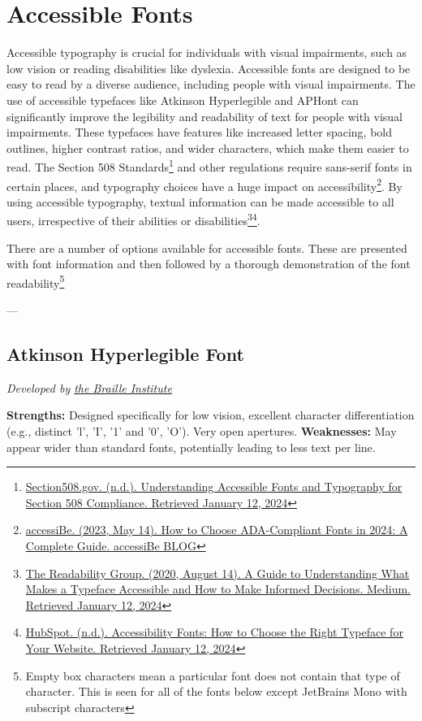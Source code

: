 \chapter{Accessible Fonts}\label{appx66}
\begin{raggedright}
Accessible typography is crucial for individuals with visual impairments, such as low vision or reading disabilities like dyslexia. Accessible fonts are designed to be easy to read by a diverse audience, including people with visual impairments. The use of accessible typefaces like Atkinson Hyperlegible and APHont can significantly improve the legibility and readability of text for people with visual impairments. These typefaces have features like increased letter spacing, bold outlines, higher contrast ratios, and wider characters, which make them easier to read. The Section 508 Standards\footnote{\raggedright \href{https://blog.hubspot.com/website/accessibility-fonts}{Section508.gov. (n.d.). Understanding Accessible Fonts and Typography for Section 508 Compliance. Retrieved January 12, 2024}} and other regulations require sans-serif fonts in certain places, and typography choices have a huge impact on accessibility\footnote{\raggedright \href{https://accessibe.com/blog/knowledgebase/ada-compliant-fonts}{accessiBe. (2023, May 14). How to Choose ADA-Compliant Fonts in 2024: A Complete Guide. accessiBe BLOG}}. By using accessible typography, textual information can be made accessible to all users, irrespective of their abilities or disabilities\footnote{\raggedright \href{https://medium.com/the-readability-group/a-guide-to-understanding-what-makes-a-typeface-accessible-and-how-to-make-informed-decisions-9e5c0b9040a0}{The Readability Group. (2020, August 14). A Guide to Understanding What Makes a Typeface Accessible and How to Make Informed Decisions. Medium. Retrieved January 12, 2024}}\footnote{\raggedright \href{https://blog.hubspot.com/website/accessibility-fonts}{HubSpot. (n.d.). Accessibility Fonts: How to Choose the Right Typeface for Your Website. Retrieved January 12, 2024}}.

There are a number of options available for accessible fonts. These are presented with font information and then followed by a thorough demonstration of the font readability\footnote{\raggedright Empty box characters mean a particular font does not contain that type of character. This is seen for all of the fonts below except JetBrains Mono with subscript characters}
\end{raggedright}

---
\section{Atkinson Hyperlegible Font}\label{trouble6}
\emph{Developed by \href{https://brailleinstitute.org/freefont}{the Braille Institute}}
\begin{raggedright}
\textbf{Strengths:} Designed specifically for low vision, excellent character differentiation (e.g., distinct 'l', 'I', '1' and '0', 'O'). Very open apertures.
\textbf{Weaknesses:} May appear wider than standard fonts, potentially leading to less text per line.

\FontSample{\atkinsonhyperlegiblefont}
\end{raggedright}


